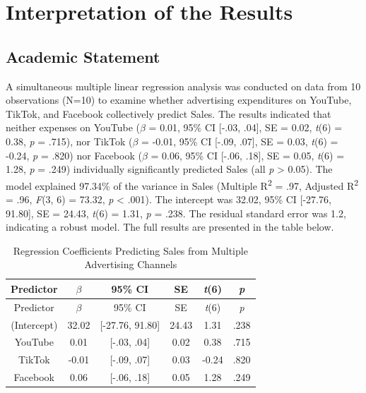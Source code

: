 \documentclass[
]{article}
\begin{document}
\section{Interpretation of the
Results}\label{interpretation-of-the-results}

\subsection{Academic Statement}\label{academic-statement}

A simultaneous multiple linear regression analysis was conducted on data
from 10 observations (N=10) to examine whether advertising expenditures
on YouTube, TikTok, and Facebook collectively predict Sales. The results
indicated that neither expenses on YouTube (\(\beta\) = 0.01, 95\% CI
{[}-.03, .04{]}, SE = 0.02, \emph{t}(6) = 0.38, \emph{p} = .715), nor
TikTok (\(\beta\) = -0.01, 95\% CI {[}-.09, .07{]}, SE = 0.03,
\emph{t}(6) = -0.24, \emph{p} = .820) nor Facebook (\(\beta\) = 0.06,
95\% CI {[}-.06, .18{]}, SE = 0.05, \emph{t}(6) = 1.28, \emph{p} = .249)
individually significantly predicted Sales (all \emph{p} \textgreater{}
0.05). The model explained 97.34\% of the variance in Sales (Multiple
R\textsuperscript{2} = .97, Adjusted R\textsuperscript{2} = .96,
\emph{F}(3, 6) = 73.32, \emph{p} \textless{} .001). The intercept was
32.02, 95\% CI {[}-27.76, 91.80{]}, SE = 24.43, \emph{t}(6) = 1.31,
\emph{p} = .238. The residual standard error was 1.2, indicating a
robust model. The full results are presented in the table below.

\begin{longtable}[]{@{}cccccc@{}}
\caption{Regression Coefficients Predicting Sales from Multiple
Advertising Channels}\tabularnewline
\toprule\noalign{}
Predictor & \(\beta\) & 95\% CI & SE & \emph{t}(6) & \emph{p} \\
\midrule\noalign{}
\endfirsthead
\toprule\noalign{}
Predictor & \(\beta\) & 95\% CI & SE & \emph{t}(6) & \emph{p} \\
\midrule\noalign{}
\endhead
\bottomrule\noalign{}
\endlastfoot
(Intercept) & 32.02 & {[}-27.76, 91.80{]} & 24.43 & 1.31 & .238 \\
YouTube & 0.01 & {[}-.03, .04{]} & 0.02 & 0.38 & .715 \\
TikTok & -0.01 & {[}-.09, .07{]} & 0.03 & -0.24 & .820 \\
Facebook & 0.06 & {[}-.06, .18{]} & 0.05 & 1.28 & .249 \\
\end{longtable}
\end{document}

